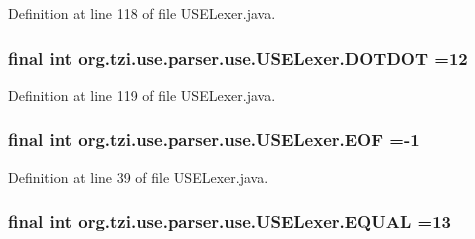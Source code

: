 Definition at line 118 of file U\-S\-E\-Lexer.\-java.

\hypertarget{classorg_1_1tzi_1_1use_1_1parser_1_1use_1_1_u_s_e_lexer_ad08d98eda3384710aa479501caaa2a4d}{
\subsubsection[{D\-O\-T\-D\-O\-T}]{\setlength{\rightskip}{0pt plus 5cm}final int org.\-tzi.\-use.\-parser.\-use.\-U\-S\-E\-Lexer.\-D\-O\-T\-D\-O\-T =12\hspace{0.3cm}{\ttfamily [static]}}}\label{classorg_1_1tzi_1_1use_1_1parser_1_1use_1_1_u_s_e_lexer_ad08d98eda3384710aa479501caaa2a4d}


Definition at line 119 of file U\-S\-E\-Lexer.\-java.

\hypertarget{classorg_1_1tzi_1_1use_1_1parser_1_1use_1_1_u_s_e_lexer_ac5e09bccee1bbbcb9a199fefdfa2024e}{
\subsubsection[{E\-O\-F}]{\setlength{\rightskip}{0pt plus 5cm}final int org.\-tzi.\-use.\-parser.\-use.\-U\-S\-E\-Lexer.\-E\-O\-F =-\/1\hspace{0.3cm}{\ttfamily [static]}}}\label{classorg_1_1tzi_1_1use_1_1parser_1_1use_1_1_u_s_e_lexer_ac5e09bccee1bbbcb9a199fefdfa2024e}


Definition at line 39 of file U\-S\-E\-Lexer.\-java.

\hypertarget{classorg_1_1tzi_1_1use_1_1parser_1_1use_1_1_u_s_e_lexer_ad0037e118b4ca521b0fcd50fd00c2a32}{
\subsubsection[{E\-Q\-U\-A\-L}]{\setlength{\rightskip}{0pt plus 5cm}final int org.\-tzi.\-use.\-parser.\-use.\-U\-S\-E\-Lexer.\-E\-Q\-U\-A\-L =13\hspace{0.3cm}{\ttfamily [static]}}}\label{classorg_1_1tzi_1_1use_1_1parser_1_1use_1_1_u_s_e_lexer_ad0037e118b4ca521b0fcd50fd00c2a32}


